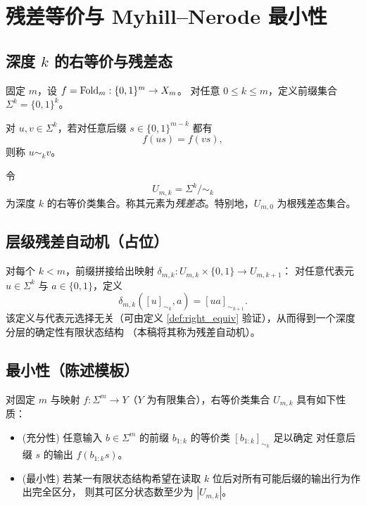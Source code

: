 \section{残差等价与 Myhill--Nerode 最小性}\label{sec:mn}

\subsection{\texorpdfstring{深度 $k$ 的右等价与残差态}{深度 k 的右等价与残差态}}
固定 $m$，设 $f=\mathrm{Fold}_m:\{0,1\}^m\to X_m$。
对任意 $0\le k\le m$，定义前缀集合 $\Sigma^k=\{0,1\}^k$。

\begin{definition}[深度 $k$ 的右等价]\label{def:right_equiv}
对 $u,v\in\Sigma^k$，若对任意后缀 $s\in\{0,1\}^{m-k}$ 都有
\[
f(us)=f(vs),
\]
则称 $u\sim_k v$。
\end{definition}

\begin{definition}[残差态集合]\label{def:residual_states}
令
\[
U_{m,k}=\Sigma^k/\!\sim_k
\]
为深度 $k$ 的右等价类集合。称其元素为\emph{残差态}。特别地，$U_{m,0}$ 为根残差态集合。
\end{definition}

\subsection{层级残差自动机（占位）}
对每个 $k<m$，前缀拼接给出映射 $\delta_{m,k}:U_{m,k}\times\{0,1\}\to U_{m,k+1}$：
对任意代表元 $u\in\Sigma^k$ 与 $a\in\{0,1\}$，定义
\[
\delta_{m,k}([u]_{\sim_k},a)=[ua]_{\sim_{k+1}}.
\]
该定义与代表元选择无关（可由定义 \ref{def:right_equiv} 验证），从而得到一个深度分层的确定性有限状态结构
（本稿将其称为残差自动机）。

\subsection{最小性（陈述模板）}
\begin{theorem}\label{thm:mn_minimality}
对固定 $m$ 与映射 $f:\Sigma^m\to Y$（$Y$ 为有限集合），右等价类集合 $U_{m,k}$ 具有如下性质：
\begin{itemize}
  \item (充分性) 任意输入 $b\in\Sigma^m$ 的前缀 $b_{1:k}$ 的等价类 $[b_{1:k}]_{\sim_k}$ 足以确定
  对任意后缀 $s$ 的输出 $f(b_{1:k}s)$。
  \item (最小性) 若某一有限状态结构希望在读取 $k$ 位后对所有可能后缀的输出行为作出完全区分，
  则其可区分状态数至少为 $|U_{m,k}|$。
\end{itemize}
\end{theorem}

